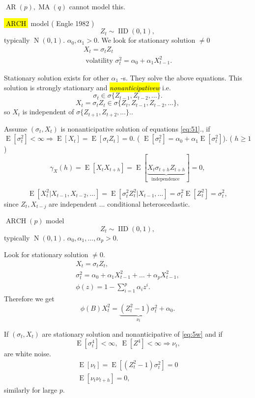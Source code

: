 \documentclass[12pt,a4paper, notitlepage]{book}
\newcommand{\hlc}[2][yellow]{ {\sethlcolor{#1} \hl{#2}} }
\newcommand{\hlcr}[1]{\hlc[lightred]{#1}}
\theoremstyle{definition} %
\theoremstyle{plain} %
\DeclareMathOperator{\E}{E}
\DeclareMathOperator{\No}{N}
\DeclareMathOperator{\Iid}{IID}
\DeclareMathOperator{\Ar}{AR}
\DeclareMathOperator{\Ma}{MA}
\DeclareMathOperator{\Arch}{ARCH}
\newcommand{\New}[1]{ {\bf \hlcr{#1} } }
\newcommand{\Important}[1]{ {\it \hlc{#1} } }
\begin{document}
$ \Ar(p) , \Ma(q) $ cannot model this.

\New{ $ \Arch $ } model ( Engle 1982 )
\[ Z_t \sim \Iid(0, 1) , \]
typically  $ \No(0,1) $. $ \alpha _0, \alpha _1 > 0 $. We look for stationary solution $ \neq 0 $ 
\begin{align*}
X_t = \sigma _t Z_t \\
\text{ volatility } \sigma _t ^2 = \alpha _0 + \alpha_1 X_{t-1}^2 
.
\end{align*}

Stationary solution exists for other $ \alpha _1 $ -s. They solve the above equations. 
This solution is strongly stationary and \Important{nonanticipativew} i.e.
\[ \sigma_t \in \sigma\{ Z_{t-1}, Z_{t-2}, \ldots \} . \]
\[ X_t = \sigma_t Z_t \in \sigma \{ Z_t , Z_{t-1}, Z_{t-2}, \ldots \} , \]
so $ X_t $ is independent of $ \sigma \{ Z_{t+1}, Z_{t+2}, \ldots \}  . $. 

Assume $ ( \sigma _t, X_t ) $ is nonanticipative solution of equations \ref{eq:51}., 
if $ \E[\sigma _t^2] < \infty \Rightarrow \E[X_t]  = \E[ \sigma_t Z_t ] = 0 . $
( $ \E[ \sigma_t^2 ] = \alpha _0 + \alpha_1 \E[   \sigma_t^2] $).
( $h \geq 1 $)
\[ \gamma _X(h) = \E[X_t X_{t+h} ] = \E[ \underbrace{X_t \sigma_{t+h} Z_{t+h} } _{\text{independence }}] = 0 , \]

\[ \E[X_t^2 | X_{t-1}, X_{t-2}, \ldots ] = \E[ \sigma_t^2 Z_t^2 | X_{t-1}, \ldots] = \sigma_t^2 \E[Z_t^2] = \sigma_t^2 , \]
since $ Z_t, X_{t-j} $ are independent ... conditional heteroscedastic.

$ \Arch(p) $ model
\[ Z_t \sim \Iid(0, 1) , \]
typically $ \No(0,1) $. 
$  \alpha_0 , \alpha _1, \ldots , \alpha_p > 0 $.

Look for stationary solution $ \neq 0 $.
\begin{align*}
 X_t = \sigma_t Z_t , \\
\sigma_t^2 = \alpha _0 + \alpha_1 X_{t-1}^2 + \ldots + \alpha_p X_{t-1} ^2 , \\
\phi(z) = 1 - \sum_{i=1}^p \alpha_i z^i .
\end{align*}
Therefore we get
\[ \phi(B) X_t^2 = \underbrace{ \left( Z_t^2 -1\right) \sigma_t^2 }_{\nu_t} + \alpha_0 . \]

If $( \sigma _t, X_t) $ are stationary solution  and nonanticipative of \ref{eq:5w} and
if 
\[  \E[ \sigma_t^4] < \infty, \; \E[Z^4] < \infty \Rightarrow \nu _t , \]
are white noise.
\begin{align*}
\E[ \nu_t] = \E\left[ \left( Z_t^2 - 1 \right) \sigma_t^2 \right] = 0 \\
\E[ \nu_t \nu_{t+h} ] = 0,
\end{align*}
similarly for large $ p$.
\end{document}
